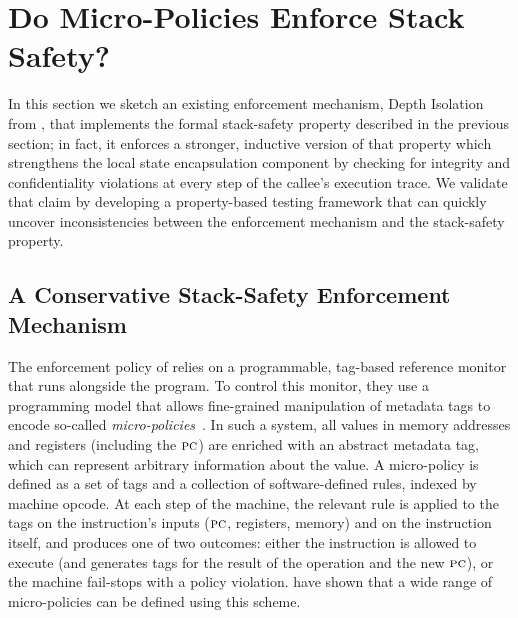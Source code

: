 \documentclass[acmsmall,review,anonymous]{acmart}\settopmatter{printfolios=true,printccs=false,printacmref=false}
\begin{document}
\section{Do Micro-Policies Enforce Stack Safety?}
\label{sec:enforcement}



In this section we sketch an existing enforcement mechanism, Depth
Isolation from \citet{DBLP:conf/sp/RoesslerD18}, that implements the
formal stack-safety property described in the previous section; in
fact, it enforces a stronger, inductive version of that property which
strengthens the local state encapsulation component by checking for
integrity and confidentiality violations at every step of the callee's
execution trace. We validate that claim by developing a property-based
testing framework that can quickly uncover inconsistencies between the
enforcement mechanism and the stack-safety property.

\subsection*{A Conservative Stack-Safety Enforcement Mechanism}
%
The enforcement policy of \citeauthor{DBLP:conf/sp/RoesslerD18} relies
on a programmable, tag-based reference monitor that runs alongside the
program.  To control this monitor, they use a programming model that
allows fine-grained manipulation of metadata tags to encode so-called
\emph{micro-policies}~\citep{pump_oakland2015}.
In such a system, all values in
memory addresses and registers (including the $\textsc{pc}$)
are enriched with an abstract metadata tag, which can represent
arbitrary information about the value. A micro-policy is defined as a set of tags and a
collection of software-defined rules, indexed by machine opcode.
At each step of the machine, the relevant rule is applied to the tags on
the instruction's inputs ($\textsc{pc}$, registers, memory) and on the instruction itself, and produces
one of two outcomes: either the instruction is allowed to execute (and generates
tags for the result of the operation and the new $\textsc{pc}$), or the machine
fail-stops with a policy violation.
\citeauthor{pump_oakland2015} have shown that a wide range of micro-policies can
be defined using this scheme.
\end{document}
